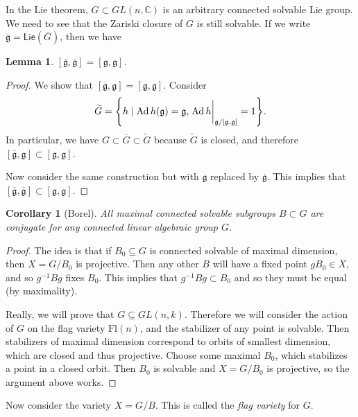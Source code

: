 \documentclass[leqno, openany]{memoir}
\newtheorem{cor}[thm]{Corollary}
\newtheorem{lem}[thm]{Lemma}
\theoremstyle{definition}
\theoremstyle{remark}
\theoremstyle{plain}
\theoremstyle{definition}
\theoremstyle{remark}
\newcommand{\C}{\mathbb{C}}
\newcommand{\mf}[1]{\mathfrak{#1}}
\newcommand{\mr}[1]{\mathrm{#1}}
\newcommand{\ms}[1]{\mathsf{#1}}
\newcommand{\ol}[1]{\overline{#1}}
\newcommand{\wtl}[1]{\widetilde{#1}}
\DeclareMathOperator{\Ad}{Ad}
\begin{document}
In the Lie theorem, $G \subset GL(n, \C)$ is an arbitrary connected solvable Lie group. We need to see that the Zariski closure of $G$ is still solvable. If we write $\ol{\mf{g}} = \ms{Lie}(\ol{G})$, then we have

\begin{lem}
    $[\ol{\mf{g}}, \ol{\mf{g}}] = [\mf{g}, \mf{g}]$. 
\end{lem}

\begin{proof}
    We show that $[\ol{\mf{g}}, \mf{g}] = [\mf{g}, \mf{g}]$. Consider 
    \[ \wtl{G} = \qty{h \mid \Ad h (\mf{g}) = \mf{g}, \eval{\Ad h}_{\mf{g} / [\mf{g}, \mf{g}]} = 1}. \] 
    In particular, we have $G \subset \ol{G} \subset \wtl{G}$ because $\wtl{G}$ is closed, and therefore $[\ol{\mf{g}}, \mf{g}] \subset [\mf{g}, \mf{g}]$.

    Now consider the same construction but with $\mf{g}$ replaced by $\ol{\mf{g}}$. This implies that $[\ol{\mf{g}}, \ol{\mf{g}}] \subset [\mf{g}, \mf{g}]$.
\end{proof}

\begin{cor}[Borel]
    All maximal connected solvable subgroups $B \subset G$ are conjugate for any connected linear algebraic group $G$.
\end{cor}

\begin{proof}
    The idea is that if $B_0 \subseteq G$ is connected solvable of maximal dimension, then $X = G/B_0$ is projective. Then any other $B$ will have a fixed point $g B_0 \in X$, and so $g^{-1} B g$ fixes $B_0$. This implies that $g^{-1}Bg \subset B_0$ and so they must be equal (by maximality).

    Really, we will prove that $G \subseteq GL(n, k)$. Therefore we will consider the action of $G$ on the flag variety $\mr{Fl}(n)$, and the stabilizer of any point is solvable. Then stabilizers of maximal dimension correspond to orbits of smallest dimension, which are closed and thus projective. Choose some maximal $B_0$, which stabilizes a point in a closed orbit. Then $B_0$ is solvable and $X = G/B_0$ is projective, so the argument above works.
\end{proof}

Now consider the variety $X = G/B$. This is called the \textit{flag variety} for $G$.
\end{document}
